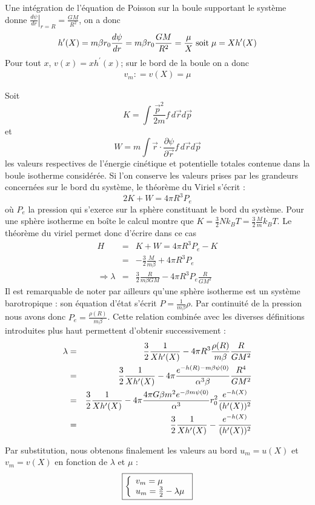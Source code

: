 	Une intégration de l'équation de Poisson sur la boule supportant le système donne $\left.\frac{d \psi}{dr} \right|_{r=R}= \frac{GM}{R^2}$, on a donc 
	\begin{eqnarray*}
		h'(X) = m\beta r_0 \frac{d \psi}{dr} = m\beta r_0 \frac{GM}{R^2} = \frac{\mu}{X} \;\textrm{soit}\; \mu = Xh'(X)
	\end{eqnarray*}
	Pour tout $x$, $v(x)=xh^{\prime}(x)$; sur le bord de la boule on a donc
	\begin{eqnarray}
		 v_m: = v\left(X\right) = \mu\label{vmmu}
	\end{eqnarray}

	Soit 
	$$K=\int \frac{\vec{p}^2}{2m}f\, d\vec{r}d\vec{p}$$
	et 
	$$W=m\int \vec{r}\cdot \frac{\partial \psi}{\partial \vec{r}}f\, d\vec{r}d\vec{p}$$ 
	les valeurs respectives de l'énergie cinétique et potentielle totales contenue dans la boule isotherme considérée. Si l'on conserve les valeurs prises par les grandeurs concernées sur le bord du système, le théorème du Viriel  s'écrit :
	\begin{equation}
		2K + W = 4\pi R^3 P_e \label{virielinabox}
	\end{equation}
	 où $P_e$ la pression qui s'exerce sur la sphère constituant le bord du système.
	Pour une sphère isotherme en boîte  le calcul montre que \mbox{$K = \frac{3}{2} N k_B T = \frac{3}{2} \frac{M}{m} k_B T$}. Le théorème du viriel permet donc d'écrire dans ce cas 
	\begin{eqnarray*}
		H &=& K + W =  4\pi R^3 P_e - K \\
		  &=& -\frac{3}{2} \frac{M}{m\beta} + 4\pi R^3 P_e \\
		\Rightarrow \lambda &=& \frac{3}{2}\frac{R}{m\beta GM} - 4\pi R^3 P_e \frac{R}{GM^2}
	\end{eqnarray*}
	Il est remarquable de noter par ailleurs qu'une sphère isotherme est un système barotropique : son équation d'état s'écrit $P=\frac{1}{m\beta}\rho$. Par continuité de la pression nous avons donc $P_e = \frac{\rho(R)}{m\beta}$. Cette relation combinée avec les diverses définitions introduites plus haut permettent d'obtenir successivement  :
	\begin{eqnarray}
		\lambda &=& \frac{3}{2}\frac{1}{Xh'(X)} - 4\pi R^3 \frac{\rho(R)}{m\beta} \frac{R}{GM^2} \notag \\
			&=& \frac{3}{2}\frac{1}{Xh'(X)} - 4\pi \frac{e^{-h(R) - m\beta\psi(0)}}{\alpha^3\beta} \frac{R^4}{GM^2} \notag \\
			&=& \frac{3}{2}\frac{1}{Xh'(X)} - 4\pi  \frac{4\pi G \beta m^2 e^{-\beta m \psi(0)}}{\alpha^3} r_0^2\frac{e^{-h(X)}}{(h'(X))^2} \notag \\
			&=& \frac{3}{2}\frac{1}{Xh'(X)} - \frac{e^{-h(X)}}{(h'(X))^2}\label{lamum}
	\end{eqnarray}

	Par substitution, nous obtenons finalement les valeurs au bord $u_m=u(X)$ et $v_m=v(X)$ en fonction de $\lambda$ et $\mu$ :
	\begin{eqnarray}
		\label{uv_max}
		\fbox{$
		\left\{\begin{array}{l}
			v_m = \mu \\
			u_m = \frac{3}{2} - \lambda \mu
		\end{array}\right.
		$}
	\end{eqnarray}

